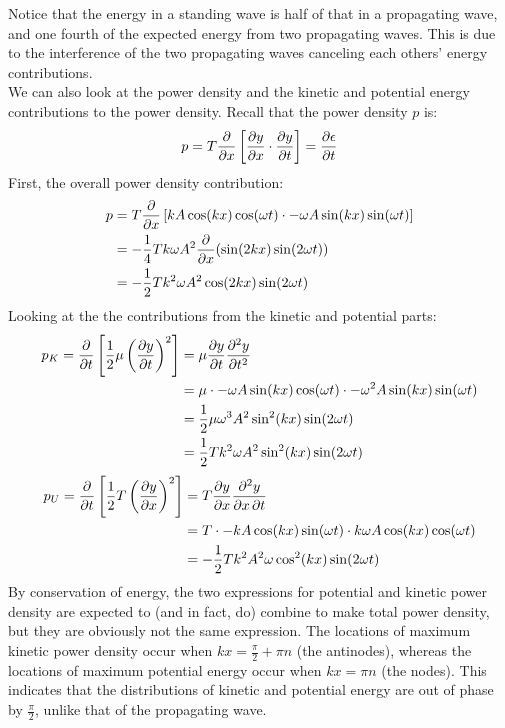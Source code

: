 Notice that the energy in a standing wave is half of that in a propagating wave, and one fourth of the expected energy from two propagating waves. This is due to the interference of the two propagating waves canceling each others' energy contributions. \\
We can also look at the power density and the kinetic and potential energy contributions to the power density. Recall that the power density $p$ is: 
\[
	p = T \frac{\partial }{\partial x} \left[\frac{\partial y}{\partial x} \cdot \frac{\partial y}{\partial t} \right] = \frac{\partial \epsilon}{\partial t} 
\]
First, the overall power density contribution: 
\begin{align*}
	p &= T \frac{\partial }{\partial x} \left[k A \cos (kx) \cos (\omega t) \cdot - \omega A \sin (kx) \sin (\omega t) \right] \\
	&= -\frac{1}{4} Tk\omega A^2 \frac{\partial }{\partial x} (\sin (2kx) \sin (2\omega t)) \\
	&= -\frac{1}{2} Tk^2 \omega A^2 \cos (2kx) \sin (2\omega t)
\end{align*}
Looking at the the contributions from the kinetic and potential parts: 
\begin{align*}
	p_K = \frac{\partial }{\partial t} \left[ \frac{1}{2} \mu \left(\frac{\partial y}{\partial t} \right)^2 \right] &= \mu \frac{\partial y}{\partial t} \frac{\partial^2 y}{\partial t^2} \\
	&= \mu \cdot -\omega A \sin (kx) \cos (\omega t) \cdot -\omega^2 A \sin(kx) \sin (\omega t) \\
	&= \frac{1}{2} \mu \omega^3 A^2  \sin^2 (kx) \sin (2 \omega t) \\
	&= \frac{1}{2} Tk^2 \omega A^2 \sin^2 (kx) \sin (2\omega t) 
\end{align*}
\begin{align*}
	p_U = \frac{\partial }{\partial t} \left[ \frac{1}{2} T \left(\frac{\partial y}{\partial x} \right)^2 \right] &= T \frac{\partial y}{\partial x} \frac{\partial^2 y}{\partial x \, \partial t} \\
	&= T \cdot -k A \cos (kx) \sin (\omega t) \cdot k\omega A \cos(kx) \cos (\omega t) \\
	&= -\frac{1}{2} Tk^2 A^2 \omega  \cos^2 (kx) \sin (2 \omega t)
\end{align*}
By conservation of energy, the two expressions for potential and kinetic power density are expected to (and in fact, do) combine to make total power density, but they are obviously not the same expression. The locations of maximum kinetic power density occur when $kx = \frac{\pi}{2} + \pi n $ (the antinodes), whereas the locations of maximum potential energy occur when $kx = \pi n$ (the nodes). This indicates that the distributions of kinetic and potential energy are out of phase by $\frac{\pi}{2}$, unlike that of the propagating wave. 

